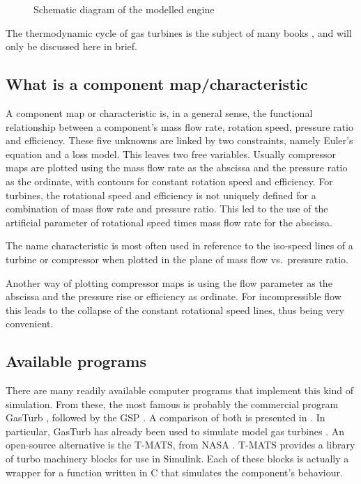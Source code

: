 \documentclass[tcc]{subfiles}
\begin{document}
\begin{figure}
    \sffamily\small 
    \caption{Schematic diagram of the modelled engine}
    \hfill\hfill
\end{figure}

The thermodynamic cycle of gas turbines is the subject of many books \cite{Mattingly1996, Cumpsty2015}, 
and will only be discussed here in brief.

\subsection{What is a component map/characteristic}

A component map or characteristic is, in a general sense, the functional relationship between a component's
mass flow rate, rotation speed, pressure ratio and efficiency. 
These five unknowns are linked by two constraints, namely Euler's equation and a loss model. 
This leaves two free variables.
Usually compressor maps are plotted using the mass flow rate as the abscissa and  the pressure ratio as the ordinate, with contours for constant rotation speed and efficiency. 
For turbines, the rotational speed and efficiency is not uniquely defined for a combination of mass flow rate and pressure ratio. This led to the use of the artificial parameter of rotational speed times mass flow rate for the abscissa.

The name characteristic is most often used in reference to the iso-speed lines of a turbine or compressor when plotted in the plane of mass flow vs.\ pressure ratio.

Another way of plotting compressor maps is using the flow parameter as the abscissa and  the pressure rise or efficiency as ordinate. 
For incompressible flow this leads to the collapse of the constant rotational speed lines, thus being very convenient.


\subsection{Available programs}

There are many readily available computer programs that implement this kind of simulation. 
From these, the most famous is probably the commercial program GasTurb \cite{GasTurb}, 
 
followed by the \gls{GSP} \cite{Visser2000}.
A comparison of both is presented in \textcite{GasTurbvsGSP}.
In particular, GasTurb has already been used to simulate model gas turbines 
\cite{gao2011modelling}.
An open-source alternative is the \gls{T-MATS}, from NASA \cite{T-MATS}.
\gls{T-MATS} provides a library of turbo machinery blocks for use in Simulink. 
Each of these blocks is actually a wrapper for a function written in C 
that simulates the component's behaviour.
\end{document}
